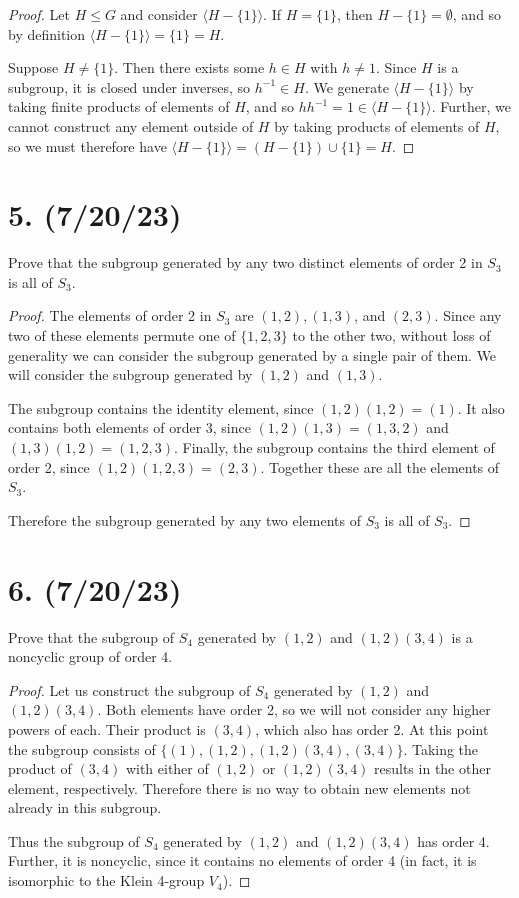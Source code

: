 \documentclass{article}
\begin{document}
\begin{proof}
    Let $H \leq G$ and consider $\langle H - \{ 1 \} \rangle$. If $H = \{ 1 \}$, then $H - \{ 1 \} = \emptyset$, and so by definition $\langle H - \{ 1 \} \rangle = \{ 1 \} = H$.

    Suppose $H \neq \{ 1 \}$. Then there exists some $h \in H$ with $h \neq 1$. Since $H$ is a subgroup, it is closed under inverses, so $h^{-1} \in H$. We generate $\langle H - \{ 1 \} \rangle$ by taking finite products of elements of $H$, and so $hh^{-1} = 1 \in \langle H - \{ 1 \} \rangle$. Further, we cannot construct any element outside of $H$ by taking products of elements of $H$, so we must therefore have $\langle H - \{ 1 \} \rangle = (H - \{ 1 \}) \cup \{ 1 \} = H$.
\end{proof}

\section*{5. (7/20/23)}

Prove that the subgroup generated by any two distinct elements of order 2 in $S_3$ is all of $S_3$.

\begin{proof}
    The elements of order 2 in $S_3$ are $(1, 2), (1, 3)$, and $(2, 3)$. Since any two of these elements permute one of $\{ 1, 2, 3 \}$ to the other two, without loss of generality we can consider the subgroup generated by a single pair of them. We will consider the subgroup generated by $(1, 2)$ and $(1, 3)$.

    The subgroup contains the identity element, since $(1, 2)(1, 2) = (1)$. It also contains both elements of order 3, since $(1, 2)(1, 3) = (1, 3, 2)$ and $(1, 3)(1, 2) = (1, 2, 3)$. Finally, the subgroup contains the third element of order 2, since $(1, 2)(1, 2, 3) = (2, 3)$. Together these are all the elements of $S_3$.

    Therefore the subgroup generated by any two elements of $S_3$ is all of $S_3$.
\end{proof}

\section*{6. (7/20/23)}

Prove that the subgroup of $S_4$ generated by $(1, 2)$ and $(1, 2)(3, 4)$ is a noncyclic group of order 4.

\begin{proof}
    Let us construct the subgroup of $S_4$ generated by $(1, 2)$ and $(1, 2)(3, 4)$. Both elements have order 2, so we will not consider any higher powers of each. Their product is $(3, 4)$, which also has order 2. At this point the subgroup consists of $\{ (1), (1, 2), (1, 2)(3, 4), (3, 4) \}$. Taking the product of $(3, 4)$ with either of $(1, 2)$ or $(1, 2)(3, 4)$ results in the other element, respectively. Therefore there is no way to obtain new elements not already in this subgroup.

    Thus the subgroup of $S_4$ generated by $(1, 2)$ and $(1, 2)(3, 4)$ has order 4. Further, it is noncyclic, since it contains no elements of order 4 (in fact, it is isomorphic to the Klein 4-group $V_4$).
\end{proof}
\end{document}
